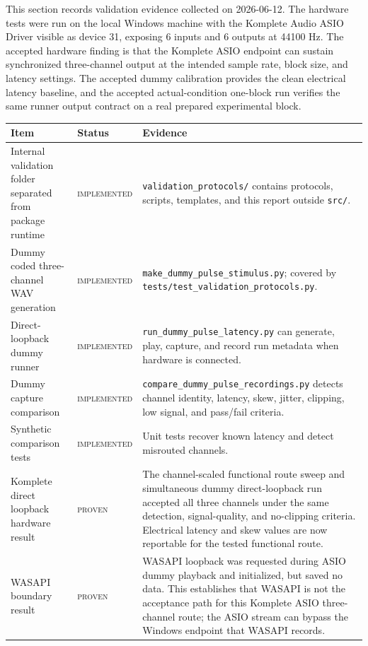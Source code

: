 \documentclass[11pt]{article}
\newcommand{\implemented}{\textsc{implemented}}
\newcommand{\proven}{\textsc{proven}}
\begin{document}
This section records validation evidence collected on 2026-06-12. The hardware
tests were run on the local Windows machine with the Komplete Audio ASIO Driver
visible as device 31, exposing 6 inputs and 6 outputs at 44100 Hz. The accepted
hardware finding is that the Komplete ASIO endpoint can sustain synchronized
three-channel output at the intended sample rate, block size, and latency
settings. The accepted dummy calibration provides the clean electrical latency
baseline, and the accepted actual-condition one-block run verifies the same
runner output contract on a real prepared experimental block.

\begin{longtable}{|p{}|p{}|p{}|}
\hline
\textbf{Item} & \textbf{Status} & \textbf{Evidence} \\
\hline
Internal validation folder separated from package runtime & \implemented{} &
\texttt{validation\_protocols/} contains protocols, scripts, templates, and
this report outside \texttt{src/}. \\
\hline
Dummy coded three-channel WAV generation & \implemented{} &
\texttt{make\_dummy\_pulse\_stimulus.py}; covered by
\texttt{tests/test\_validation\_protocols.py}. \\
\hline
Direct-loopback dummy runner & \implemented{} &
\texttt{run\_dummy\_pulse\_latency.py} can generate, play, capture, and record
run metadata when hardware is connected. \\
\hline
Dummy capture comparison & \implemented{} &
\texttt{compare\_dummy\_pulse\_recordings.py} detects channel identity,
latency, skew, jitter, clipping, low signal, and pass/fail criteria. \\
\hline
Synthetic comparison tests & \implemented{} &
Unit tests recover known latency and detect misrouted channels. \\
\hline
Komplete direct loopback hardware result & \proven{} & The channel-scaled
functional route sweep and simultaneous dummy direct-loopback run accepted all
three channels under the same detection, signal-quality, and no-clipping
criteria. Electrical latency and skew values are now reportable for the tested
functional route. \\
\hline
WASAPI boundary result & \proven{} & WASAPI loopback was requested during ASIO
dummy playback and initialized, but saved no data. This establishes that WASAPI
is not the acceptance path for this Komplete ASIO three-channel route; the ASIO
stream can bypass the Windows endpoint that WASAPI records. \\

\end{longtable}
\end{document}
